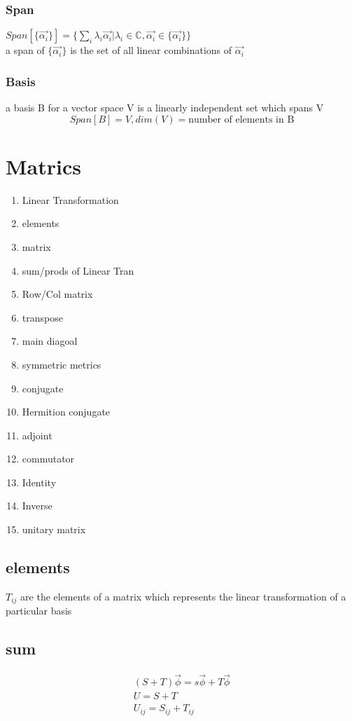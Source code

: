 \documentclass[12pt, a4paper]{article}
\begin{document}
\subsubsection{Span}
$Span[\{\vec{\alpha_i}\}]=\{\sum_i \lambda_i\vec{\alpha_i}|\lambda_i\in \mathbb{C}, \vec{\alpha_i}\in \{\vec{\alpha_i}\}\}$\\
a span of $\{\vec{\alpha_i}\}$ is the set of all linear combinations of $\vec{\alpha_i}$
\subsubsection{Basis}
a basis B for a vector space V is a linearly independent set which spans V $$Span[B]=V,dim(V)=\text{number of elements in B}$$


\section{Matrics}
\begin{enumerate}
\item Linear Transformation
\item elements
\item matrix
\item sum/prods of Linear Tran
\item Row/Col matrix
\item transpose
\item main diagoal
\item symmetric metrics
\item conjugate
\item Hermition conjugate
\item adjoint
\item commutator
\item Identity
\item Inverse
\item unitary matrix
\end{enumerate}
\subsection{elements}
$T_{ij}$ are the elements of a matrix which represents the linear transformation of a particular basis
\subsection{sum}
\begin{align*}
(S+T)\vec{\phi}=s\vec{\phi}+T\vec{\phi}\\
U=S+T\\
U_{ij}=S_{ij}+T_{ij}
\end{align*}
\end{document}
